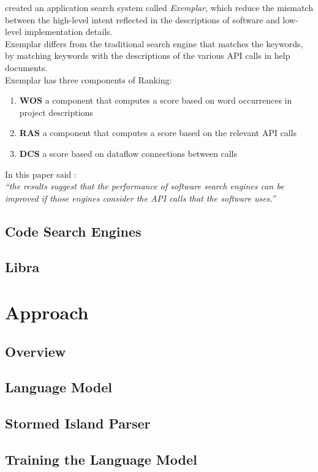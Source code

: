 \documentclass[12pt,mscthesis]{usiinfthesis}
\begin{document}
	\citep{journals/tse/McMillanGPFX12} created an application search system called \textit{Exemplar}, which reduce the mismatch between the high-level intent reflected in the descriptions of software and low-level implementation details.\\ Exemplar differs from the traditional search engine that matches the keywords, by matching keywords with the descriptions of the various API calls in help documents.\\
	Exemplar has three components of Ranking: 
	\begin{enumerate}
		\item \textbf{WOS} a component that computes a score based on word occurrences in project descriptions
		\item \textbf{RAS} a component that computes a score based on the relevant API calls
		\item \textbf{DCS} a score based on dataflow connections between calls
	\end{enumerate}
	In this paper \citet{journals/tse/McMillanGPFX12} said : \\
	\textit{``the results suggest that the performance of software search engines can be improved if those engines consider the API calls that the software uses.''}

	\section{Code Search Engines}
	\section{Libra}



\chapter{Approach}
	\section{Overview}
	\section{Language Model}
	\section{Stormed Island Parser}
	\section{Training the Language Model}
\end{document}
